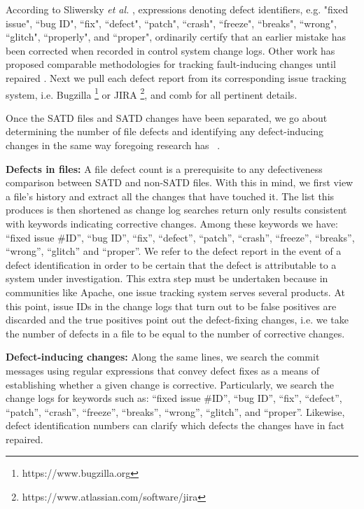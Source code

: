 According to Sliwersky \textit{et al.} \cite{sliwerski-msr-2005}, expressions denoting defect identifiers, e.g. "fixed issue", ``bug ID", ``fix", ``defect", ``patch", ``crash", ``freeze", ``breaks", ``wrong", ``glitch", ``properly", and ``proper", ordinarily certify that an earlier mistake has been corrected when recorded in control system change logs. Other work has proposed comparable methodologies for tracking fault-inducing changes until repaired \cite{Kamei-tse-2013, Kim-tse-2008, sliwerski-msr-2005}. Next we pull each defect report from its corresponding issue tracking system, i.e. Bugzilla \footnote{https://www.bugzilla.org} or JIRA \footnote{https://www.atlassian.com/software/jira}, and comb for all pertinent details.


Once the SATD files and SATD changes have been separated, we go about determining the number of file defects and identifying any defect-inducing changes in the same way foregoing research has ~\cite{Kamei-tse-2013, Kim-tse-2008, sliwerski-msr-2005}.

\noindent\textbf{Defects in files:}
A file defect count is a prerequisite to any defectiveness comparison between SATD and non-SATD files. With this in mind, we first view a file's history and extract all the changes that have touched it. The list this produces is then shortened as change log searches return only results consistent with keywords indicating corrective changes. Among these keywords we have: ``fixed issue \#ID'', ``bug ID'',  ``fix'',  ``defect'',  ``patch'', ``crash'',  ``freeze'', ``breaks'', ``wrong'', ``glitch'' and ``proper''. We refer to the defect report in the event of a defect identification in order to be certain that the defect is attributable to a system under investigation. This extra step must be undertaken because in communities like Apache, one issue tracking system serves several products.  At this point, issue IDs in the change logs that turn out to be false positives are discarded and the true positives point out the defect-fixing changes, i.e. we take the number of defects in a file to be equal to the number of corrective changes.

\noindent \textbf{Defect-inducing changes:}
Along the same lines, we search the commit messages using regular expressions that convey defect fixes as a means of establishing whether a given change is corrective. Particularly, we search the change logs for keywords such as: ``fixed issue \#ID'', ``bug ID'',  ``fix'',  ``defect'',  ``patch'', ``crash'',  ``freeze'', ``breaks'', ``wrong'', ``glitch'', and ``proper''. Likewise, defect identification numbers can clarify which defects the changes have in fact repaired.\\

